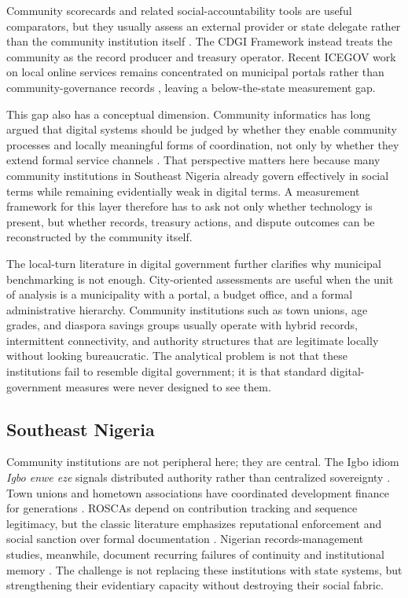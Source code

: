 \documentclass[sigconf]{acmart}
\begin{document}
Community scorecards and related social-accountability tools are useful comparators, but they usually assess an external provider or state delegate rather than the community institution itself \cite{cooke2001,bjorkman2009}. The CDGI Framework instead treats the community as the record producer and treasury operator. Recent ICEGOV work on local online services remains concentrated on municipal portals rather than community-governance records \cite{gasco2017,janowski2015}, leaving a below-the-state measurement gap.

This gap also has a conceptual dimension. Community informatics has long argued that digital systems should be judged by whether they enable community processes and locally meaningful forms of coordination, not only by whether they extend formal service channels \cite{gurstein2007}. That perspective matters here because many community institutions in Southeast Nigeria already govern effectively in social terms while remaining evidentially weak in digital terms. A measurement framework for this layer therefore has to ask not only whether technology is present, but whether records, treasury actions, and dispute outcomes can be reconstructed by the community itself.

The local-turn literature in digital government further clarifies why municipal benchmarking is not enough. City-oriented assessments are useful when the unit of analysis is a municipality with a portal, a budget office, and a formal administrative hierarchy. Community institutions such as town unions, age grades, and diaspora savings groups usually operate with hybrid records, intermittent connectivity, and authority structures that are legitimate locally without looking bureaucratic. The analytical problem is not that these institutions fail to resemble digital government; it is that standard digital-government measures were never designed to see them.

\subsection{Southeast Nigeria}

Community institutions are not peripheral here; they are central. The Igbo idiom \textit{Igbo enwe eze} signals distributed authority rather than centralized sovereignty \cite{okafor1992}. Town unions and hometown associations have coordinated development finance for generations \cite{honey1998}. ROSCAs depend on contribution tracking and sequence legitimacy, but the classic literature emphasizes reputational enforcement and social sanction over formal documentation \cite{ardener1964,besley1993}. Nigerian records-management studies, meanwhile, document recurring failures of continuity and institutional memory \cite{abioye2007}. The challenge is not replacing these institutions with state systems, but strengthening their evidentiary capacity without destroying their social fabric.
\end{document}
